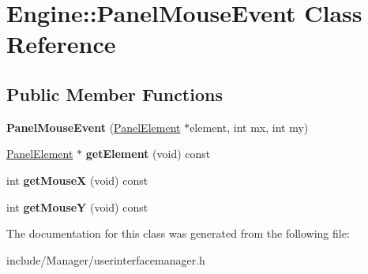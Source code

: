 \hypertarget{classEngine_1_1PanelMouseEvent}{}\section{Engine\+:\+:Panel\+Mouse\+Event Class Reference}
\label{classEngine_1_1PanelMouseEvent}
\subsection*{Public Member Functions}
\begin{DoxyCompactItemize}
\item 
\hypertarget{classEngine_1_1PanelMouseEvent_a7f901a923cff1561b01b958bcd93dd69}{}{\bfseries Panel\+Mouse\+Event} (\hyperlink{classEngine_1_1PanelElement}{Panel\+Element} $\ast$element, int mx, int my)\label{classEngine_1_1PanelMouseEvent_a7f901a923cff1561b01b958bcd93dd69}

\item 
\hypertarget{classEngine_1_1PanelMouseEvent_a8346dd064801f1497ca567ae06a794ae}{}\hyperlink{classEngine_1_1PanelElement}{Panel\+Element} $\ast$ {\bfseries get\+Element} (void) const \label{classEngine_1_1PanelMouseEvent_a8346dd064801f1497ca567ae06a794ae}

\item 
\hypertarget{classEngine_1_1PanelMouseEvent_a0744ce2649bf9d6fe34cfc2e538887c6}{}int {\bfseries get\+Mouse\+X} (void) const \label{classEngine_1_1PanelMouseEvent_a0744ce2649bf9d6fe34cfc2e538887c6}

\item 
\hypertarget{classEngine_1_1PanelMouseEvent_ad71770a06e7a64297f241b3c8aa11f2b}{}int {\bfseries get\+Mouse\+Y} (void) const \label{classEngine_1_1PanelMouseEvent_ad71770a06e7a64297f241b3c8aa11f2b}

\end{DoxyCompactItemize}


The documentation for this class was generated from the following file\+:\begin{DoxyCompactItemize}
\item 
include/\+Manager/userinterfacemanager.\+h\end{DoxyCompactItemize}
